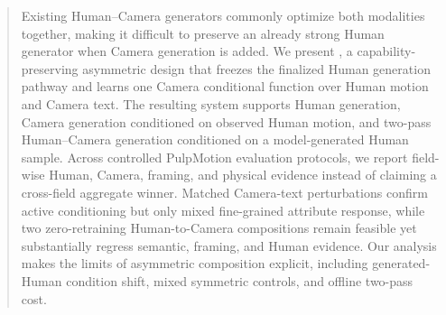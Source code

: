 \begin{abstract}
Existing Human--Camera generators commonly optimize both modalities together, making it
difficult to preserve an already strong Human generator when Camera generation is added.
We present \storymotion, a capability-preserving asymmetric design that freezes the finalized
Human generation pathway and learns one Camera conditional function over Human motion and
Camera text. The resulting system supports Human generation, Camera generation conditioned on
observed Human motion, and two-pass Human--Camera generation conditioned on a model-generated
Human sample. Across controlled PulpMotion evaluation protocols, we report field-wise Human,
Camera, framing, and physical evidence instead of claiming a cross-field aggregate winner.
Matched Camera-text perturbations confirm active conditioning but only mixed fine-grained
attribute response, while two zero-retraining Human-to-Camera compositions remain feasible yet
substantially regress semantic, framing, and Human evidence.
Our analysis makes the limits of asymmetric composition explicit, including generated-Human
condition shift, mixed symmetric controls, and offline two-pass cost.
\end{abstract}
